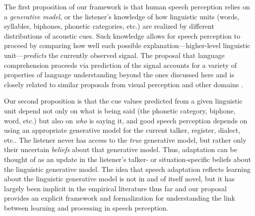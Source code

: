 The first proposition of our framework is that human speech perception relies on a \emph{generative model}, or the listener's knowledge of how linguistic units (words, syllables, biphones, phonetic categories, etc.) are realized by different distributions of acoustic cues.  Such knowledge allows for speech perception to proceed by comparing how well each possible explanation---higher-level linguistic unit---\emph{predicts} the currently observed signal.  The proposal that language comprehension proceeds via prediction of the signal accounts for a variety of properties of language understanding beyond the ones discussed here \autocite[cf.][]{Dell2014,Farmer2013,Jaeger2013a,MacDonald2013,Pickering2013} and is closely related to similar proposals from visual perception and other domains \autocite{Clark2013,Friston2005,Hinton2007,Huang2011,Rao1999}.

\label{r1-cues-depend-who}
Our second proposition is that the cue values predicted from a given linguistic unit depend not only on what is being said (the phonetic category, biphone, word, etc.) but also on \emph{who} is saying it, and good speech perception depends on using an appropriate generative model for the current talker, register, dialect, etc..  The listener never has access to the \emph{true} generative model, but rather only their uncertain \emph{beliefs} about that generative model.  Thus, adaptation can be thought of as an update in the listener's talker- or situation-specific beliefs about the linguistic generative model.  The idea that speech adaptation reflects learning about the linguistic generative model is not in and of itself novel, but it has largely been implicit in the empirical literature thus far and our proposal provides an explicit framework and formalization for understanding the link between learning and processing in speech perception.

